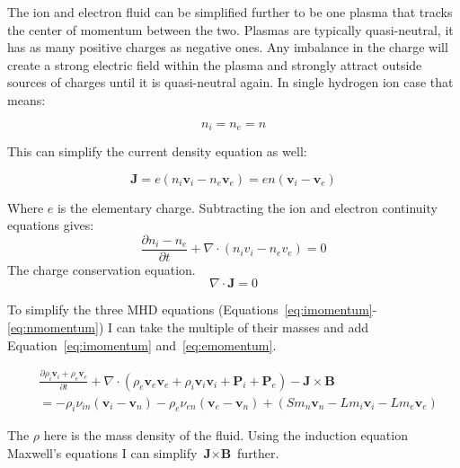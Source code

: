 \documentclass[12pt,upcase]{umlthesis}
\begin{document}
The ion and electron fluid can be simplified further to be one plasma that tracks the center of momentum between the two. Plasmas are typically quasi-neutral, it has as many positive charges as negative ones. Any imbalance in the charge will create a strong electric field within the plasma and strongly attract outside sources of charges until it is quasi-neutral again. In single hydrogen ion case that means:


\begin{equation}\label{eq:quasineutrality}
	n_i = n_e = n
\end{equation}

This can simplify the current density equation as well:

\begin{equation}\label{eq:currentdensity}
	\textbf{J} = e ( n_i \textbf{v}_i - n_e \textbf{v}_e) = e n (\textbf{v}_i - \textbf{v}_e)
\end{equation}

Where $e$ is the elementary charge. Subtracting the ion and electron continuity equations gives:
\begin{equation}
	\frac{\partial n_i - n_e}{\partial t} + \nabla\cdot(n_i v_i - n_e v_e) = 0
\end{equation}
The charge conservation equation.
\begin{equation}\label{eq:chargeconservation}
	\nabla\cdot\textbf{J} = 0
\end{equation}


To simplify the three MHD equations (Equations~\ref{eq:imomentum}-\ref{eq:nmomentum}) I can take the multiple of their masses and add Equation~\ref{eq:imomentum} and~\ref{eq:emomentum}.

\begin{equation}\label{eq:singlemomentum}
	\begin{aligned}
		& \frac{\partial \rho_i \textbf{v}_i + \rho_e \textbf{v}_e}{\partial t} + \nabla \cdot (\rho_e \textbf{v}_e \textbf{v}_e + \rho_i \textbf{v}_i \textbf{v}_i + \textbf{P}_i + \textbf{P}_e) - \textbf{J} \times \textbf{B} \\
		& = - \rho_i \nu_{in}(\textbf{v}_i - \textbf{v}_n) - \rho_e \nu_{en} (\textbf{v}_e - \textbf{v}_n)+ (S m_n \textbf{v}_n - L m_i \textbf{v}_i - L m_e \textbf{v}_e)
\end{aligned}
\end{equation}

The $\rho$ here is the mass density of the fluid. Using the induction equation Maxwell's equations I can simplify $\textbf{J} \times \textbf{B}$ further.
\end{document}
